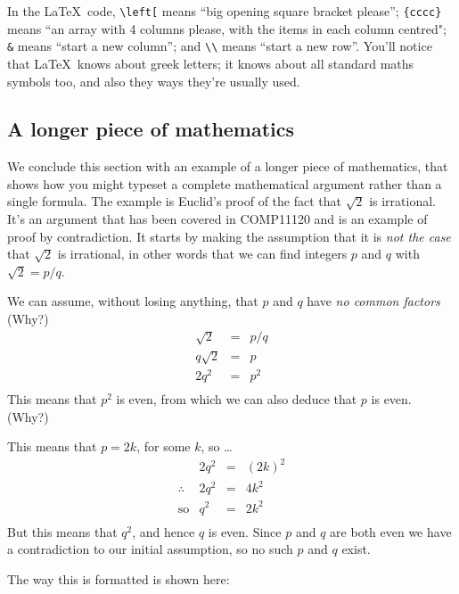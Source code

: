 \begin{refsection}
In the \LaTeX\ code,  \verb|\left[| means ``big opening square bracket please'';  \verb|{cccc}| means ``an array with 4 columns please, with the items in each column centred"; \verb|&| means ``start a new column''; and \verb|\\| means ``start a new row''. You'll notice that \LaTeX\ knows about  greek letters; it knows about all standard maths symbols too, and also they ways  they're usually used.


  \subsection{A longer piece of mathematics}
\label{sec:longer-piece-maths}

  We conclude this section with an example of a longer piece of mathematics, that shows how you might typeset a complete mathematical argument rather than a single formula. The example is Euclid's proof of the fact that $\sqrt{2}$ is irrational. It's an argument that has been covered in COMP11120 and is an example of proof by contradiction. It starts by making the assumption that it is \emph{not the case} that $\sqrt{2}$ is irrational, in other words that we can find integers $p$ and $q$ with $\sqrt{2} = p/q$.

  We can assume, without losing anything, that $p$ and $q$ have \emph{no common factors} (Why?)
  \[
  \begin{array}{lcl}
     \sqrt{2}    & = & p/q \\ 
      q\sqrt{2} & = & p   \\ 
      2q^2       & = & p^2 \\ 
  \end{array}
  \]
  This means that $p^2$ is even, from which we can also deduce that $p$ is even. (Why?)

  This means that $p = 2k$, for some $k$, so \ldots
  \[
  \begin{array}{llcl}
                       & 2q^2 & = & (2k)^2 \\ 
      \therefore & 2q^2 & = & 4k^2   \\ 
      \text{so}   & q^2   & = & 2k^2   \\
   \end{array}
  \]
  But this means that $q^2$, and hence $q$ is  even. Since $p$ and $q$ are both even we have a contradiction to our initial assumption, so no such $p$ and $q$ exist.

The way this is formatted is shown here:

{\small
\begin{verbatim}


\end{verbatim}}
\end{refsection}
